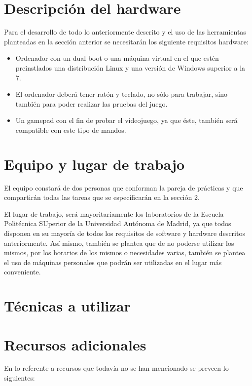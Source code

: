 \documentclass[palatino]{apuntes}
\begin{document}
\section{Descripción del hardware}
Para el desarrollo de todo lo anteriormente descrito y el uso de las herramientas planteadas en la sección anterior se necesitarán los siguiente requisitos hardware:

\begin{itemize}
	\item Ordenador con un dual boot o una máquina virtual en el que estén preinstlados una distribución Linux y una versión de Windows superior a la 7.
	\item El ordenador deberá tener ratón y teclado, no sólo para trabajar, sino también para poder realizar las pruebas del juego.
	\item Un gamepad con el fin de probar el videojuego, ya que éste, también será compatible con este tipo de mandos.
\end{itemize}



\section{Equipo y lugar de trabajo}

El equipo constará de dos personas que conforman la pareja de prácticas y que compartirán todas las tareas que se especificarán en la sección 2.

El lugar de trabajo, será mayoritariamente los laboratorios de la Escuela Politécnica SUperior de la Universidad Autónoma de Madrid, ya que todos disponen en su mayoría de todos los requisitos de software y hardware descritos anteriormente. Así mismo, también se plantea que de no poderse utilizar los mismos, por los horarios de los mismos o necesidades varias, también se plantea el uso de máquinas personales que podrán ser utilizadas en el lugar más conveniente.


\section{Técnicas a utilizar}

\section{Recursos adicionales}
En lo referente a recursos que todavía no se han mencionado se preveen lo siguientes:
\end{document}
